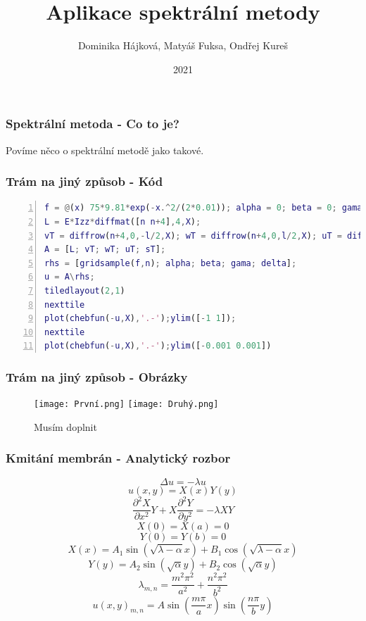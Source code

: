 \documentclass{beamer}
\title{Aplikace spektrální metody}
\author{Dominika Hájková, Matyáš Fuksa, Ondřej Kureš}
\institute{Stormtrooperz}
\date{2021}
\begin{document}
\frame{\titlepage}
\begin{frame}
\frametitle{Spektrální metoda - Co to je?}
Povíme něco o spektrální metodě jako takové.
\end{frame}

\begin{frame}[fragile]
\frametitle{Trám na jiný způsob - Kód}
\begin{lstlisting}[language=Matlab, basicstyle=\small, numbers=left,breaklines=true]
f = @(x) 75*9.81*exp(-x.^2/(2*0.01)); alpha = 0; beta = 0; gama = 0 ;delta = 0; n = 18; E = 9.4*10^6; Izz = 3;l = 10;X = [-l/2,l/2];
L = E*Izz*diffmat([n n+4],4,X);
vT = diffrow(n+4,0,-l/2,X); wT = diffrow(n+4,0,l/2,X); uT = diffrow(n+4,1,-l/2,X); sT = diffrow(n+4,1,l/2,X);
A = [L; vT; wT; uT; sT];
rhs = [gridsample(f,n); alpha; beta; gama; delta];
u = A\rhs;
tiledlayout(2,1)
nexttile
plot(chebfun(-u,X),'.-');ylim([-1 1]);
nexttile
plot(chebfun(-u,X),'.-');ylim([-0.001 0.001])
\end{lstlisting}
\end{frame}

\begin{frame}
\frametitle{Trám na jiný způsob - Obrázky}
\centering
\begin{figure}
\texttt{[image: První.png]}
\texttt{[image: Druhý.png]}
\caption{Musím doplnit}
\end{figure}
\end{frame}

\begin{frame}
\frametitle{Kmitání membrán - Analytický rozbor}
\begin{equation}
\Delta u=-\lambda u
\end{equation}
\begin{equation}
u(x,y)=X(x) Y(y)
\end{equation}
\begin{equation}
   \frac{\partial^2 X}{\partial x^2} Y
      + X \frac{\partial^2 Y}{\partial y^2}=-\lambda X Y
\end{equation}
\begin{equation}
X(0)=X(a)=0
\end{equation}
\begin{equation}
Y(0)=Y(b)=0
\end{equation}
\begin{equation}
X(x)=A_1 \sin{(\sqrt{\lambda-\alpha}x)}+B_1 \cos{(\sqrt{\lambda-\alpha}x)}
\end{equation}
\begin{equation}
Y(y)=A_2 \sin{(\sqrt{\alpha}y)}+B_2 \cos{(\sqrt{\alpha}y)}
\end{equation}
\begin{equation}
\lambda_{m,n}=\frac{m^2\pi^2}{a^2}+\frac{n^2\pi^2}{b^2}
\end{equation}
\begin{equation}
u(x,y)_{m,n}=A\sin{(\frac{m\pi}{a}x)}\sin{(\frac{n\pi}{b}y)}
\end{equation}
\end{frame}
\end{document}
